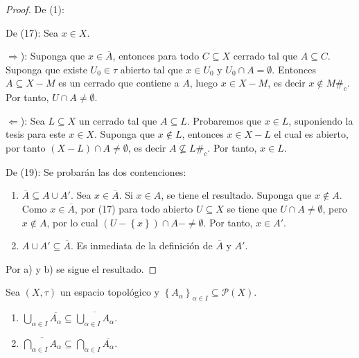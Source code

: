 \documentclass[12pt]{report}
\theoremstyle{largebreak}
\newcommand\contradiction{\ensuremath{\#_c}}
\newcommand{\Cls}[1]{\ensuremath{\overline{#1}}}
\begin{document}
    \begin{proof}
        De (1):

        De (17): Sea $x\in X$.
        
        $\Rightarrow$): Suponga que $x\in\Cls{A}$, entonces para todo $C\subseteq X$ cerrado tal que $A\subseteq C$. Suponga que existe $U_0\in\tau$ abierto tal que $x\in U_0$ y $U_0\cap A=\emptyset$. Entonces $A\subseteq X-M$ es un cerrado que contiene a $A$, luego $x\in X-M$, es decir $x\notin M$\contradiction. Por tanto, $U\cap A\neq\emptyset$.

        $\Leftarrow$): Sea $L\subseteq X$ un cerrado tal que $A\subseteq L$. Probaremos que $x\in L$, suponiendo la tesis para este $x\in X$. Suponga que $x\notin L$, entonces $x\in X-L$ el cual es abierto, por tanto $(X-L)\cap A\neq\emptyset$, es decir $A\nsubseteq L$\contradiction. Por tanto, $x\in L$.
        
        De (19): Se probarán las dos contenciones:
        \renewcommand{\theenumi}{\alph{enumi})}
        \begin{enumerate}
            \item $\Cls{A}\subseteq A\cup A'$. Sea $x\in\Cls{A}$. Si $x\in A$, se tiene el resultado. Suponga que $x\notin A$. Como $x\in\Cls{A}$, por (17) para todo abierto $U\subseteq X$ se tiene que $U\cap A\neq\emptyset$, pero $x\notin A$, por lo cual $(U-\left\{x\right\})\cap A-\neq\emptyset$. Por tanto, $x\in A'$.
            \item $A\cup A'\subseteq\Cls{A}$. Es inmediata de la definición de $\Cls{A}$ y $A'$.
        \end{enumerate}
        Por a) y b) se sigue el resultado.
    \end{proof}

    \renewcommand{\theenumi}{\arabic{enumi}}

    \begin{propo}
        Sea $(X,\tau)$ un espacio topológico y $\left\{A_\alpha \right\}_{\alpha\in I}\subseteq\mathcal{P}(X)$.
        \begin{enumerate}
            \item $\bigcup_{\alpha\in I}\Cls{A_\alpha}\subseteq\Cls{\bigcup_{\alpha\in I}A_\alpha}$.
            \item $\Cls{\bigcap_{\alpha\in I}A_\alpha}\subseteq\bigcap_{\alpha\in I}\Cls{A_\alpha}$. 
        \end{enumerate}
    \end{propo}
\end{document}
